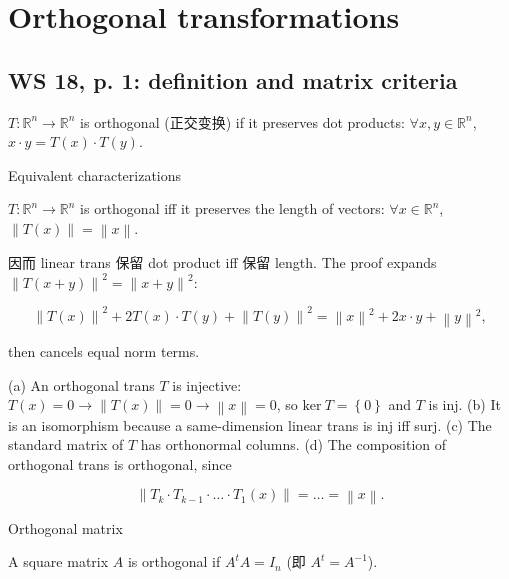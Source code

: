\chapter{Orthogonal transformations}

\section{WS 18, p. 1: definition and matrix criteria}

\begin{definition}{}

\(T:\mathbb{R}^{n}\rightarrow\mathbb{R}^{n}\) is orthogonal (正交变换) if it preserves dot products: \(\forall x,y \in \mathbb{R}^{n}\), \(x \cdot y = T(x) \cdot T(y)\).

\end{definition}

\begin{theorem}{Equivalent characterizations}

\(T:\mathbb{R}^{n}\rightarrow\mathbb{R}^{n}\) is orthogonal iff it preserves the length of vectors: \(\forall x \in \mathbb{R}^{n}\), \(\left\| {T(x)} \right\| = \left\| x \right\|\).

\end{theorem}

因而 linear trans 保留 dot product iff 保留 length. The proof expands \(\left\| {T\left( {x + y} \right)} \right\|^{2} = \left\| {x + y} \right\|^{2}\):

\[\left\| {T(x)} \right\|^{2} + 2T(x) \cdot T(y) + \left\| {T(y)} \right\|^{2} = \left\| x \right\|^{2} + 2x \cdot y + \left\| y \right\|^{2},\]

then cancels equal norm terms.

(a) An orthogonal trans \(T\) is injective: \(T(x) = 0\rightarrow\left\| {T(x)} \right\| = 0\rightarrow\left\| x \right\| = 0\), so \(\text{ker}\ T = \left\{ 0 \right\}\) and \(T\) is inj. (b) It is an isomorphism because a same-dimension linear trans is inj iff surj. (c) The standard matrix of \(T\) has orthonormal columns. (d) The composition of orthogonal trans is orthogonal, since

\[\left\| {T_{k} \cdot T_{k - 1} \cdot \ldots \cdot T_{1}(x)} \right\| = \ldots = \left\| x \right\|.\]

\begin{definition}{Orthogonal matrix}

A square matrix \(A\) is orthogonal if \(A^{t}A = I_{n}\) (即 \(A^{t} = A^{- 1}\)).

\end{definition}

